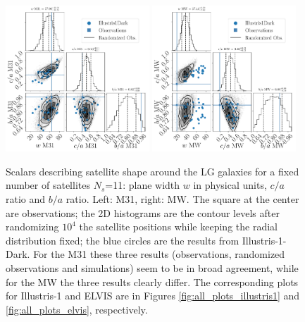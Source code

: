 \documentclass[a4paper,fleqn,usenatbib]{mnras}
\begin{document}
\begin{figure}
\centering
\includegraphics[width=0.48\textwidth]{input_illustris1dark_obs_M31_n_11.pdf}
\includegraphics[width=0.48\textwidth]{input_illustris1dark_obs_MW_n_11.pdf}
\caption{Scalars describing satellite shape around the LG galaxies for
  a fixed number of satellites $N_s$=11:
  plane width $w$ in physical units, $c/a$ ratio and $b/a$ ratio.
  Left: M31, right: MW. The square at the center are observations; the
2D histograms are the contour levels after randomizing $10^4$ the
satellite positions while keeping the radial distribution fixed; the
blue circles are the results from Illustris-1-Dark. For the M31 these
three results (observations, randomized observations and simulations)
seem to be in broad agreement, while for the MW the three results
clearly differ. 
The corresponding plots for Illustris-1 and ELVIS are
in Figures \ref{fig:all_plots_illustris1} and
\ref{fig:all_plots_elvis},
respectively. \label{fig:physical_illustris1dark}}     
\end{figure}
\end{document}
